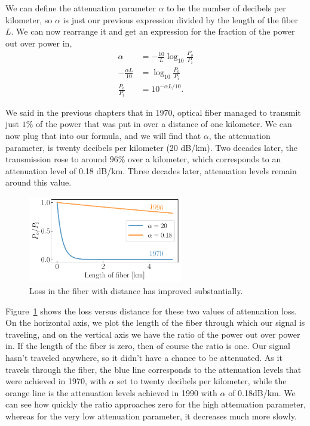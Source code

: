 We can define the attenuation parameter $\alpha$ to be the number of decibels per kilometer, so $\alpha$ is just our previous expression divided by the length of the fiber $L$. We can now rearrange it and get an expression for the fraction of the power out over power in,
\begin{equation}
\begin{aligned}
\alpha & =-\frac{10}{L} \log _{10} \frac{P_o}{P_i} \\
-\frac{\alpha L}{10} & =\log _{10} \frac{P_o}{P_i} \\
\frac{P_o}{P_i} & =10^{-\alpha L / 10}.
\end{aligned}
\end{equation}

We said in the previous chapters that in 1970, optical fiber managed to transmit just $1\%$ of the power that was put in over a distance of one kilometer. We can now plug that into our formula, and we will find that $\alpha$, the attenuation parameter, is twenty decibels per kilometer (20 dB/km). Two decades later, the transmission rose to around $96\%$ over a kilometer, which corresponds to an attenuation level of 0.18 dB/km. Three decades later, attenuation levels remain around this value.

\begin{figure}
    \centering
    \includegraphics[width=0.6\textwidth]{lesson11/11-3_attenuation_dB.pdf}
    \caption[Power loss in fiber]{Loss in the fiber with distance has improved substantially.}
    \label{fig:11-3_attenuation_dB}
\end{figure}
Figure~\ref{fig:11-3_attenuation_dB} shows the loss versus distance for these two values of attenuation loss. On the horizontal axis, we plot the length of the fiber through which our signal is traveling, and on the vertical axis we have the ratio of the power out over power in. If the length of the fiber is zero, then of course the ratio is one. Our signal hasn't traveled anywhere, so it didn't have a chance to be attenuated. As it travels through the fiber, the blue line corresponds to the attenuation levels that were achieved in 1970, with $\alpha$ set to twenty decibels per kilometer, while the orange line is the attenuation levels achieved  in 1990 with $\alpha$ of 0.18dB/km. We can see how quickly the ratio approaches zero for the high attenuation parameter, whereas for the very low attenuation parameter, it decreases much more slowly.

